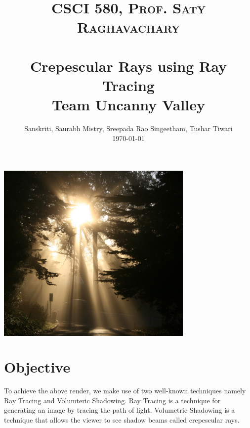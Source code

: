 \documentclass[paper=a4, fontsize=11pt]{scrartcl}
\title{
		\usefont{OT1}{bch}{b}{n}
		\normalfont \normalsize \textsc{CSCI 580, Prof. Saty Raghavachary} \\ [25pt]
		\horrule{0.4pt} \\[0.5cm]
		\huge\textbf{Crepescular Rays using Ray Tracing} \\
		\vspace{10pt}
		\normalsize\textbf{Team Uncanny Valley}
		\horrule{0.4pt} \\[0.5cm]
}
\author{
		\normalfont\normalsize
        Sanskriti, Saurabh Mistry, Sreepada Rao Singeetham, Tushar Tiwari\\[-3pt]		\normalsize
        \today
}
\date{}
\renewcommand{\headrulewidth}{0pt}			%
\renewcommand{\footrulewidth}{0pt}				%
\numberwithin{equation}{section}		%
\numberwithin{figure}{section}			%
\numberwithin{table}{section}				%
\begin{document}
\maketitle
\begin{center}\includegraphics[height=250pt]{crep1}\end{center}
\section{Objective}
To achieve the above render, we make use of two well-known techniques namely Ray Tracing and Volumteric Shadowing. Ray Tracing is a technique for generating an image by tracing the path of light. Volumetric Shadowing is a technique that allows the viewer to see shadow beams called crepescular rays.
\newpage
\tableofcontents
\newpage
\fancyhf{}
\fancyfoot[CE,CO]{\leftmark}
\fancyfoot[LE,RO]{\thepage}
\renewcommand{\headrulewidth}{1pt}
\renewcommand{\footrulewidth}{1pt}
\end{document}
